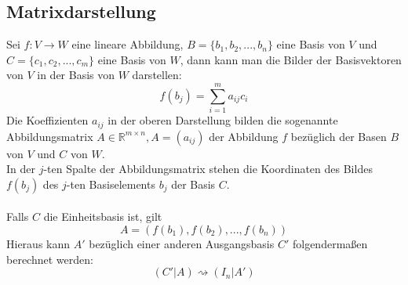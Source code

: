 \documentclass[a4paper,twocolumn,10pt]{article}
\begin{document}
\subsection{Matrixdarstellung}
Sei $f:V\rightarrow W$ eine lineare Abbildung, $B=\{b_1,b_2,...,b_n\}$ eine Basis von $V$ und $C=\{c_1,c_2,...,c_m\}$ eine Basis von $W$, dann kann man die Bilder der Basisvektoren von $V$ in der Basis von $W$ darstellen:
\begin{equation*}
f(b_j)=\sum\limits_{i=1}^{m}a_{ij}c_i
\end{equation*}
Die Koeffizienten $a_{ij}$ in der oberen Darstellung bilden die sogenannte Abbildungsmatrix $A\in \mathbb{R}^{m\times n},A=(a_{ij})$ der Abbildung $f$ bezüglich der Basen $B$ von $V$ und $C$ von $W$.\\
In der $j$-ten Spalte der Abbildungsmatrix stehen die Koordinaten des Bildes $f(b_j)$ des $j$-ten Basiselements $b_j$ der Basis $C$.\\\\
Falls $C$ die Einheitsbasis ist, gilt
\begin{equation*}
A=(f(b_1),f(b_2),...,f(b_n))
\end{equation*}
Hieraus kann $A'$ bezüglich einer anderen Ausgangsbasis $C'$ folgendermaßen berechnet werden:
\begin{equation*}
(C'|A)\rightsquigarrow (I_n|A')
\end{equation*}
\end{document}
